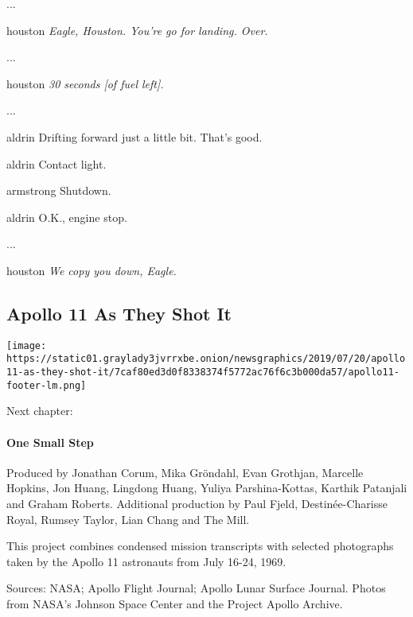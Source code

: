 ...

houston \emph{Eagle, Houston. You're go for landing. Over.}

...

houston \emph{30 seconds {[}of fuel left{]}.}

...

aldrin Drifting forward just a little bit. That's good.

aldrin Contact light.

armstrong Shutdown.

aldrin O.K., engine stop.

...

houston \emph{We copy you down, Eagle.}

\hypertarget{apollo-11-as-they-shot-it-1}{%
\subsection{\texorpdfstring{\textbf{Apollo 11} As They Shot
It}{Apollo 11 As They Shot It}}\label{apollo-11-as-they-shot-it-1}}

\href{https://www.nytimes3xbfgragh.onion/interactive/2019/07/18/science/apollo-11-moon-landing-photos-ul.html}{}

\texttt{[image: https://static01.graylady3jvrrxbe.onion/newsgraphics/2019/07/20/apollo11-as-they-shot-it/7caf80ed3d0f8338374f5772ac76f6c3b000da57/apollo11-footer-lm.png]}

Next chapter:

\hypertarget{one-small-step}{%
\paragraph{One Small Step}\label{one-small-step}}

Produced by Jonathan Corum, Mika Gröndahl, Evan Grothjan, Marcelle
Hopkins, Jon Huang, Lingdong Huang, Yuliya Parshina-Kottas, Karthik
Patanjali and Graham Roberts. Additional production by Paul Fjeld,
Destinée-Charisse Royal, Rumsey Taylor, Lian Chang and The Mill.

This project combines condensed mission transcripts with selected
photographs taken by the Apollo 11 astronauts from July 16-24, 1969.

Sources: NASA; Apollo Flight Journal; Apollo Lunar Surface Journal.
Photos from NASA's Johnson Space Center and the Project Apollo Archive.
